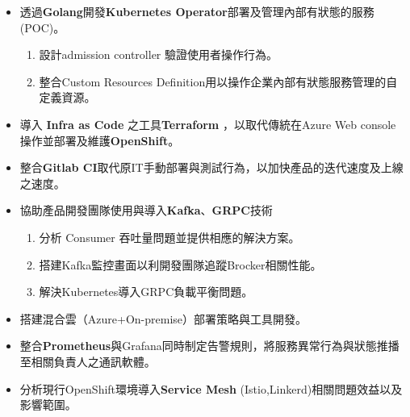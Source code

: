 \begin{experiences}
{\begin{itemize}
                        \item 透過\textbf{Golang}開發\textbf{Kubernetes Operator}部署及管理內部有狀態的服務 (POC)。
                        \begin{enumerate}
                        	\item 設計admission controller 驗證使用者操作行為。
                            \item 整合Custom Resources Definition用以操作企業內部有狀態服務管理的自定義資源。
                        \end{enumerate}
                        \item 導入 \textbf{Infra as Code} 之工具\textbf{Terraform} ，以取代傳統在Azure Web console 操作並部署及維護\textbf{OpenShift}。           
                        \item 整合\textbf{Gitlab CI}取代原IT手動部署與測試行為，以加快產品的迭代速度及上線之速度。                
                        \item 協助產品開發團隊使用與導入\textbf{Kafka}、\textbf{GRPC}技術
                        \begin{enumerate}
                        	\item 分析 Consumer 吞吐量問題並提供相應的解決方案。
                            \item 搭建Kafka監控畫面以利開發團隊追蹤Brocker相關性能。
                            \item 解決Kubernetes導入GRPC負載平衡問題。
                        \end{enumerate}
                        \item 搭建混合雲（Azure+On-premise）部署策略與工具開發。
                        \item 整合\textbf{Prometheus}與Grafana同時制定告警規則，將服務異常行為與狀態推播至相關負責人之通訊軟體。
                        \item 分析現行OpenShift環境導入\textbf{Service Mesh} (Istio,Linkerd)相關問題效益以及影響範圍。
                        

\end{itemize}}
\end{experiences}
